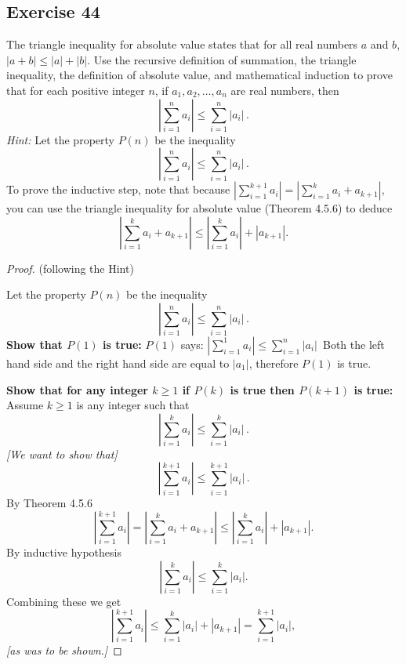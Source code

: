 \documentclass[14pt]{extarticle}
\begin{document}
    \subsection{Exercise 44}
    The triangle inequality for absolute value states that for all real numbers $a$ and $b$, $|a + b| \leq |a| + |b|$.
    Use the recursive definition of summation, the triangle inequality, the definition of absolute value, and
    mathematical induction to prove that for each positive integer $n$, if $a_1, a_2, \ldots, a_n$ are real numbers, then
    \[
        \left|\sum_{i = 1}^{n} a_i \right| \leq \sum_{i = 1}^{n}|a_i|\,.
    \]
    {\it Hint:} Let the property $P(n)$ be the inequality
    \[
        \left|\sum_{i = 1}^{n} a_i \right| \leq \sum_{i = 1}^{n}|a_i|\,.
    \]
    To prove the inductive step, note that because \(|\sum_{i = 1}^{k + 1} a_i | = |\sum_{i = 1}^k a_i + a_{k + 1}|\),
    you can use the triangle inequality for absolute value (Theorem 4.5.6) to deduce
    \[
        \left|\sum_{i = 1}^k a_i + a_{k + 1}\right| \leq \left|\sum_{i = 1}^k a_i\right| + |a_{k + 1}|.
    \]
    \begin{proof}
        (following the Hint)

        Let the property $P(n)$ be the inequality
        \[
            \left|\sum_{i = 1}^{n} a_i \right| \leq \sum_{i = 1}^{n}|a_i|\,.
        \]
        {\bf Show that $P(1)$ is true:} $P(1)$ says: \(\left|\sum_{i = 1}^{1} a_i \right| \leq \sum_{i = 1}^{n}|a_i|\,\)
        Both the left hand side and the right hand side are equal to \(|a_1|\), therefore $P(1)$ is true.

            {\bf Show that for any integer \(k \geq 1\) if $P(k)$ is true then $P(k+1)$ is true:}
        Assume \(k \geq 1\) is any integer such that
        \[
            \left|\sum_{i = 1}^{k} a_i \right| \leq \sum_{i = 1}^{k}|a_i|\,.
        \]
        {\it [We want to show that]}
        \[
            \left|\sum_{i = 1}^{k+1} a_i \right| \leq \sum_{i = 1}^{k+1}|a_i|\,.
        \]
        By Theorem 4.5.6
        \[
            \left|\sum_{i = 1}^{k + 1} a_i \right| = \left|\sum_{i = 1}^k a_i + a_{k + 1}\right| \leq \left|\sum_{i = 1}^k a_i\right| + |a_{k + 1}|.
        \]
        By inductive hypothesis
        \[
            \left|\sum_{i = 1}^k a_i\right| \leq \sum_{i = 1}^k |a_i|.
        \]
        Combining these we get
        \[
            \left|\sum_{i = 1}^{k + 1} a_i \right| \leq \sum_{i = 1}^k |a_i| + |a_{k + 1}| = \sum_{i = 1}^{k+1} |a_i|,
        \]
        {\it [as was to be shown.]}
    \end{proof}
\end{document}
